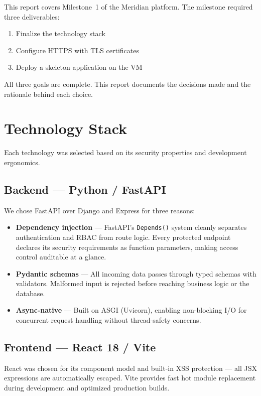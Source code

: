 \documentclass[12pt, a4paper]{article}
\begin{document}
This report covers Milestone~1 of the Meridian platform. The milestone required three deliverables:

\begin{enumerate}
    \item Finalize the technology stack
    \item Configure HTTPS with TLS certificates
    \item Deploy a skeleton application on the VM
\end{enumerate}

All three goals are complete. This report documents the decisions made and the rationale behind each choice.

\section{Technology Stack}

Each technology was selected based on its security properties and development ergonomics.

\subsection{Backend — Python / FastAPI}

We chose FastAPI over Django and Express for three reasons:

\begin{itemize}
    \item \textbf{Dependency injection} — FastAPI's \texttt{Depends()} system cleanly separates authentication and RBAC from route logic. Every protected endpoint declares its security requirements as function parameters, making access control auditable at a glance.
    \item \textbf{Pydantic schemas} — All incoming data passes through typed schemas with validators. Malformed input is rejected before reaching business logic or the database.
    \item \textbf{Async-native} — Built on ASGI (Uvicorn), enabling non-blocking I/O for concurrent request handling without thread-safety concerns.
\end{itemize}

\subsection{Frontend — React 18 / Vite}

React was chosen for its component model and built-in XSS protection — all JSX expressions are automatically escaped. Vite provides fast hot module replacement during development and optimized production builds.
\end{document}

